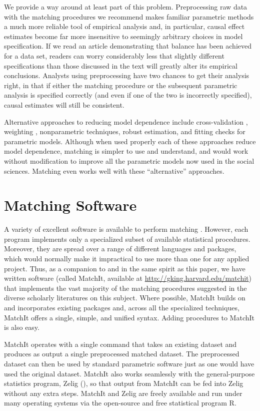 \documentclass[11pt,titlepage]{article}
\begin{document}
We provide a way around at least part of this problem.  Preprocessing
raw data with the matching procedures we recommend makes familiar
parametric methods a much more reliable tool of empirical analysis
and, in particular, causal effect estimates become far more
insensitive to seemingly arbitrary choices in model specification.  If
we read an article demonstrating that balance has been achieved for a
data set, readers can worry considerably less that slightly different
specifications than those discussed in the text will greatly alter its
empirical conclusions.  Analysts using preprocessing have two chances
to get their analysis right, in that if either the matching procedure
or the subsequent parametric analysis is specified correctly (and even
if one of the two is incorrectly specified), causal estimates will
still be consistent.

Alternative approaches to reducing model dependence include
cross-validation \citep{BlaSmi04}, weighting \citep{RobRot03,
  HirImbRid03}, nonparametric techniques, robust estimation, and
fitting checks for parametric models.  Although when used properly
each of these approaches reduce model dependence, matching is simpler
to use and understand, and would work without modification to improve
all the parametric models now used in the social sciences.  Matching
even works well with these ``alternative'' approaches.

\appendix
\section{Matching Software}\label{s:matchit}

A variety of excellent software is available to perform matching
\citep{AbaDruLeb02, BecIch02, BerKos03, Hansen05, LeuSia04, Parsons00,
  Parsons01, Sekhon04}.  However, each program implements only a
specialized subset of available statistical procedures.  Moreover,
they are spread over a range of different languages and packages,
which would normally make it impractical to use more than one for any
applied project.  Thus, as a companion to and in the same spirit as
this paper, we have written software (called MatchIt, available at
\url{http://gking.harvard.edu/matchit})  that implements the vast majority of the matching
procedures suggested in the diverse scholarly literatures on this
subject.  Where possible, MatchIt builds on and incorporates existing
packages and, across all the specialized techniques, MatchIt offers a
single, simple, and unified syntax.  Adding procedures to MatchIt is
also easy.

MatchIt operates with a single command that takes an existing dataset
and produces as output a single preprocessed matched dataset.  The
preprocessed dataset can then be used by standard parametric software
just as one would have used the original dataset.  MatchIt also works
seamlessly with the general-purpose statistics program, Zelig
(\citealt{ImaKinLau04}), so that output from MatchIt can be fed into
Zelig without any extra steps.  MatchIt and Zelig are freely available
and run under many operating systems via the open-source and free
statistical program R.

\baselineskip 


\end{document}
